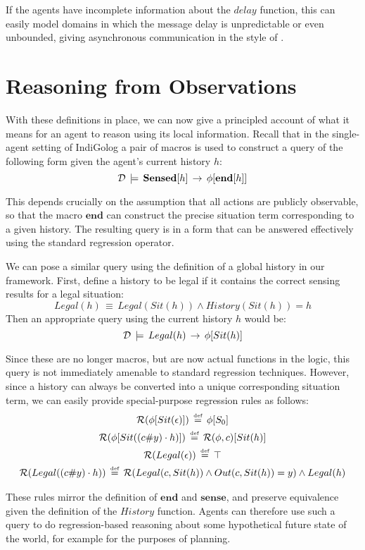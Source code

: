 If the agents have incomplete information about the $delay$ function,
this can easily model domains in which the message delay is unpredictable
or even unbounded, giving asynchronous communication in the style
of \citep{halpern90knowledge_distrib}.


\section{Reasoning from Observations\label{sec:Observations:Reasoning}}

With these definitions in place, we can now give a principled account
of what it means for an agent to reason using its local information.
Recall that in the single-agent setting of IndiGolog \citep{giacomo99indigolog}
a pair of macros is used to construct a query of the following form
given the agent's current history $h$:\[
\mathcal{D}\,\models\,\mathbf{Sensed}[h]\,\rightarrow\,\phi[\mathbf{end}[h]]\]


This depends crucially on the assumption that all actions are publicly
observable, so that the macro $\mathbf{end}$ can construct the precise
situation term corresponding to a given history. The resulting query
is in a form that can be answered effectively using the standard regression
operator.

We can pose a similar query using the definition of a global history
in our framework. First, define a history to be legal if it contains
the correct sensing results for a legal situation:\[
Legal(h)\,\equiv\, Legal(Sit(h))\wedge History(Sit(h))=h\]
 Then an appropriate query using the current history $h$ would be:\[
\mathcal{D}\,\models\, Legal(h)\,\rightarrow\,\phi[Sit(h)]\]


Since these are no longer macros, but are now actual functions in
the logic, this query is not immediately amenable to standard regression
techniques. However, since a history can always be converted into
a unique corresponding situation term, we can easily provide special-purpose
regression rules as follows: \begin{gather*}
\mathcal{R}(\phi[Sit(\epsilon)])\,\stackrel{\mbox{\tiny def}}{=}\,\phi[S_{0}]\\
\mathcal{R}(\phi[Sit((c\#y)\cdot h)])\,\stackrel{\mbox{\tiny def}}{=}\,\mathcal{R}(\phi,c)[Sit(h)]\\
\mathcal{R}(Legal(\epsilon))\,\stackrel{\mbox{\tiny def}}{=}\,\top\\
\mathcal{R}(Legal((c\#y)\cdot h))\,\stackrel{\mbox{\tiny def}}{=}\,\mathcal{R}(Legal(c,Sit(h))\wedge Out(c,Sit(h))=y)\wedge Legal(h)\end{gather*}


These rules mirror the definition of $\mathbf{end}$ and $\mathbf{sense}$,
and preserve equivalence given the definition of the $History$ function.
Agents can therefore use such a query to do regression-based reasoning
about some hypothetical future state of the world, for example for
the purposes of planning.

